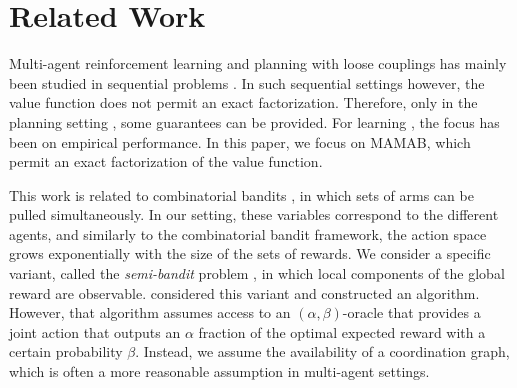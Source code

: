\documentclass{article}
\def\hado#1{\textcolor{RubineRed}{\textbf{Hado: ``#1''}}}
\begin{document}

\section{Related Work}

Multi-agent reinforcement learning and planning with loose couplings has mainly been studied in
sequential problems \cite{Guestrin02,KokVlassis06,DeHauwere:2010,scharpff16solving}.  In such sequential settings
however, the value function does not permit an exact factorization. Therefore, only in the planning
setting \cite{scharpff16solving}, some guarantees can be provided. For learning \cite{KokVlassis06},
the focus has been on empirical performance. In this paper, we focus on MAMAB, which permit an
exact factorization of the value function.

This work is related to combinatorial bandits \citep{bubeck2012regret, cesa2012combinatorial,
gai2012combinatorial, chen2013combinatorial}, in which sets of arms can be pulled simultaneously.
In our setting, these variables correspond to the different agents, and similarly to the
combinatorial bandit framework, the action space grows exponentially with the size of the sets of
rewards.
We consider a specific variant, called the \emph{semi-bandit} problem \cite{audibert2011minimax}, in
which local components of the global reward are observable. \citet{chen2013combinatorial} considered
this variant and constructed an algorithm.  However, that algorithm assumes access to an $(\alpha,
\beta)$-oracle that provides a joint action that outputs an $\alpha$ fraction of the optimal
expected reward with a certain probability $\beta$.  Instead, we assume the availability of a
coordination graph, which is often a more reasonable assumption in multi-agent settings.
\end{document}
